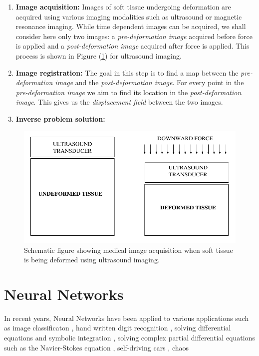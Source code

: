 \documentclass[12pt]{article}
\begin{document}
\begin{enumerate}
\item{\textbf{Image acquisition:} Images of soft tissue undergoing deformation are acquired using various imaging modalities such as ultrasound or magnetic resonance imaging. While time dependent images can be acquired, we shall consider here only two images: a \textit{pre-deformation image} acquired before force is applied and a \textit{post-deformation image} acquired after force is applied. This process is shown in Figure (\ref{fig:prepostimage}) for ultrasound imaging.}
\item{\textbf{Image registration:} The goal in this step is to find a map between the \textit{pre-deformation image} and the \textit{post-deformation image}. For every point in the \textit{pre-deformation image} we aim to find its location in the \textit{post-deformation image}. This gives us the \textit{displacement field} between the two images.}
\item{\textbf{Inverse problem solution:}}
\end{enumerate}
%
\begin{figure}
   \centering
    \includegraphics[totalheight=5cm]{Figures/prepostimage.png}
  \caption{\label{fig:prepostimage} Schematic figure showing medical image acquisition when soft tissue is being deformed using ultrasound imaging.}
\end{figure}
%
\section{Neural Networks}
In recent years, Neural Networks have been applied to various applications such as image classificaton \cite{paper:hinton2017}, hand written digit recognition \cite{paper:kulkarni2018}, solving differential equations and symbolic integration \cite{misc:lample2019}, solving complex partial differential equations such as the Navier-Stokes equation \cite{misc:anandkumar2020}, self-driving cars \cite{misc:agnihotri2019,misc:nvidiaselfdriving2016}, chaos 
%
\end{document}
